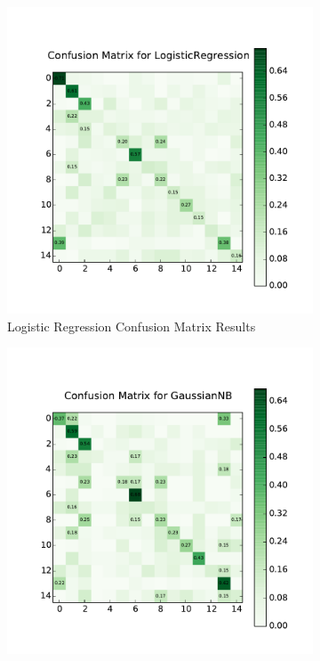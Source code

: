 \begin{figure}
	\centering
	\begin{subfigure}[b]{0.45\linewidth}
		\centering
		\includegraphics[width=\linewidth]{images/baseline/cm_log_reg.pdf}
		\caption{Logistic Regression Confusion Matrix Results}
	\end{subfigure}
	\hfill
	\begin{subfigure}[b]{0.45\linewidth}
		\centering
		\includegraphics[width=\linewidth]{images/baseline/cm_naive_bayes.pdf}

\end{subfigure}
\end{figure}
